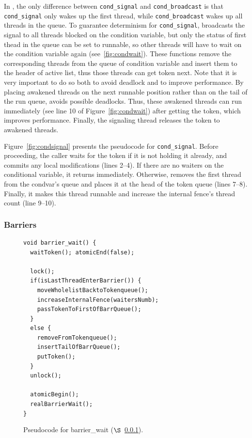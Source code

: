 In \pthreads{}, the only difference between \texttt{cond\_signal}
and \texttt{cond\_broadcast} is that \texttt{cond\_signal} only wakes up the
first thread, while \texttt{cond\_broadcast} wakes up all threads in the
queue. To guarantee determinism for \texttt{cond\_signal}, \dthreads{}
broadcasts the signal to all threads blocked on the condition
variable, but only the status of first thead in the queue can be set
to runnable, so other threads will have to wait on the condition
variable again (see~\ref{fig:condwait}).
These functions remove the corresponding threads from the queue
of condition variable and insert them to the header of active list,
thus those threads can get token next.  Note that it is very important
to do so both to avoid deadlock and to improve performance. By placing
awakened threads on the next runnable position rather than on the tail
of the run queue, \dthreads{} avoids possible deadlocks. 
Thus, these awakened threads can run immediately (see line 10 of Figure~\ref{fig:condwait}) 
after getting the token, which improves performance. Finally, the
signaling thread releases the token to awakened threads.

Figure~\ref{fig:condsignal} presents the pseudocode
for \texttt{cond\_signal}. Before proceeding, the caller waits for
the token if it is not holding it already, and commits any local
modifications (lines 2--4).  If there are no waiters on the
conditional variable, it returns immediately. Otherwise, \dthreads{}
removes the first thread from the condvar's queue and places it at the
head of the token queue (lines 7--8). Finally, it makes this thread
runnable and increase the internal fence's thread count (line 9--10).

\subsubsection{Barriers}

\label{sec:barrierwait}

\begin{figure}
\begin{lstlisting}
void barrier_wait() {
  waitToken(); atomicEnd(false);
 
  lock();
  if(isLastThreadEnterBarrier()) {
	moveWholelistBacktoTokenqueue();
	increaseInternalFence(waitersNumb);
	passTokenToFirstOfBarrQueue();
  } 
  else {
    removeFromTokenqueue();
	insertTailOfBarrQueue();
	putToken();
  }
  unlock();

  atomicBegin();
  realBarrierWait();  
}
\end{lstlisting}
\caption{Pseudocode for barrier\_wait ($\S$~\ref{sec:barrierwait}).
\label{fig:barrierwait}}
\end{figure}


